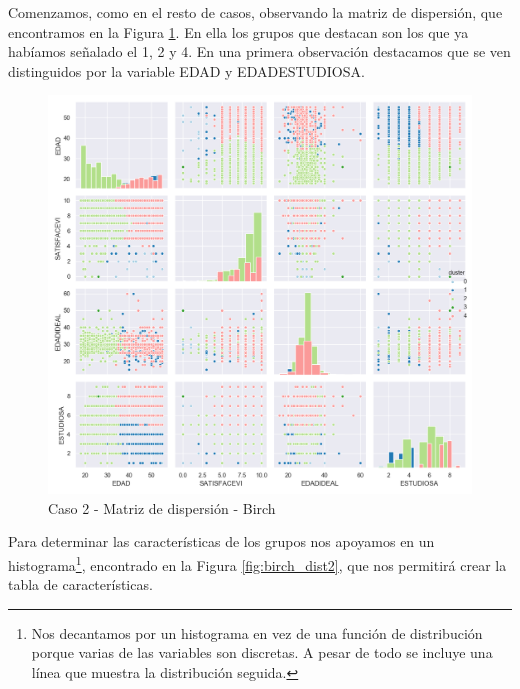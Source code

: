 \documentclass[a4paper, 20pt]{article}
\begin{document}
Comenzamos, como en el resto de casos, observando la matriz de dispersión, que encontramos en la Figura \ref{fig:birch_scattermatrix2}. En ella los grupos que destacan son los que ya habíamos señalado el 1, 2 y 4. En una primera observación destacamos que se ven distinguidos por la variable EDAD y EDADESTUDIOSA. 

\begin{figure}[H]
    \centering
    \includegraphics[width=1\textwidth]{./caso2/Birch_scattermatrix}
    \caption{Caso 2 - Matriz de dispersión - Birch}
    \label{fig:birch_scattermatrix2}
\end{figure}

Para determinar las características de los grupos nos apoyamos en un histograma\footnote{Nos decantamos por un histograma en vez de una función de distribución porque varias de las variables son discretas. A pesar de todo se incluye una línea que muestra la distribución seguida.}, encontrado en la Figura \ref{fig:birch_dist2}, que nos permitirá crear la tabla de características.
\end{document}
